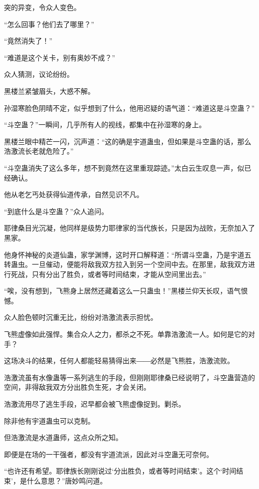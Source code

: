 
\begin{this_body}

突的异变，令众人变色。

“怎么回事？他们去了哪里？”

“竟然消失了！”

“难道是这个关卡，别有奥妙不成？”

众人猜测，议论纷纷。

黑楼兰紧皱眉头，大惑不解。

孙湿寒脸色阴晴不定，似乎想到了什么，他用迟疑的语气道：“难道这是斗空蛊？”

“斗空蛊？”一瞬间，几乎所有人的视线，都集中在孙湿寒的身上。

黑楼兰眼中精芒一闪，沉声道：“这的确是宇道蛊虫，但如果是斗空蛊的话，那么浩激流长老就危险了。”

“斗空蛊消失了这么多年，想不到竟然在这里重现踪迹。”太白云生叹息一声，似已经确认。

他从老乞丐处获得仙道传承，自然见识不凡。

“到底什么是斗空蛊？”众人追问。

耶律桑目光沉凝，他同样是级势力耶律家的当代族长，只是因为战败，无奈加入了黑家。

他身怀神秘的炎道仙蛊，家学渊博，这时开口解释道：“所谓斗空蛊，乃是宇道五转蛊虫。一旦催动，便能将敌我双方拉入到另一个空间中去。在那里，敌我双方进行死战，只有分出了胜负，或者等时间结束，才能从空间里出去。”

“唉，没有想到，飞熊身上居然还藏着这么一只蛊虫！”黑楼兰仰天长叹，语气恨憾。

众人脸色顿时沉重无比，纷纷对浩激流表示担忧。

飞熊虚像如此强悍。集合众人之力，都杀之不死。单靠浩激流一人。如何是它的对手？

这场决斗的结果，任何人都能轻易猜得出来――必然是飞熊胜，浩激流败。

浩激流虽有水像蛊等一系列逃生的手段，但刚刚耶律桑已经说明了，斗空蛊营造的空间，非得敌我双方分出胜负生死，才会关闭。

浩激流用尽了逃生手段，迟早都会被飞熊虚像捉到。剿杀。

除非他有宇道蛊虫可以克制。

但浩激流是水道蛊师，这点众所之知。

即便是在场的一干强者，都没有宇道流派，因此对斗空蛊无可奈何。

“也许还有希望。耶律族长刚刚说过‘分出胜负，或者等时间结束’。这个‘时间结束’，是什么意思？”唐妙鸣问道。


\end{this_body}
